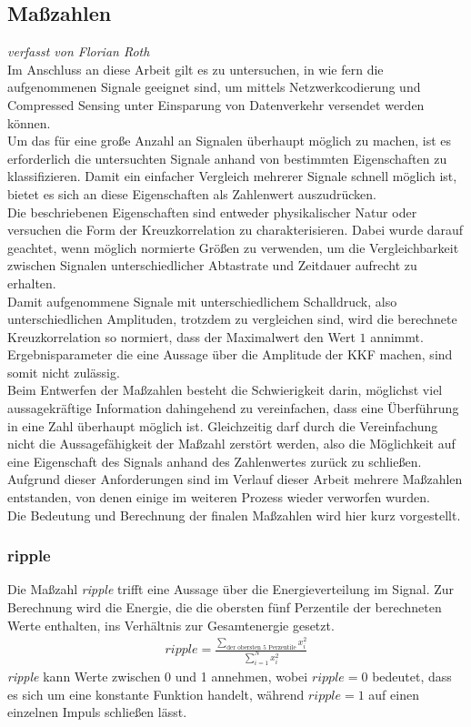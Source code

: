 \subsection{Maßzahlen}
\small\textit{verfasst von Florian Roth}
\normalsize
\\ Im Anschluss an diese Arbeit gilt es zu untersuchen, in wie fern die aufgenommenen Signale geeignet sind, um mittels Netzwerkcodierung und Compressed Sensing unter Einsparung von Datenverkehr versendet werden können. 
\\ Um das für eine große Anzahl an Signalen überhaupt möglich zu machen, ist es erforderlich die untersuchten Signale anhand von  bestimmten Eigenschaften zu klassifizieren. Damit ein einfacher Vergleich mehrerer Signale schnell möglich ist, bietet es sich an diese Eigenschaften als Zahlenwert auszudrücken. 
\\ Die beschriebenen Eigenschaften sind entweder physikalischer Natur oder versuchen die Form der Kreuzkorrelation zu charakterisieren. Dabei wurde darauf geachtet, wenn möglich normierte Größen zu verwenden, um die Vergleichbarkeit zwischen Signalen unterschiedlicher Abtastrate und Zeitdauer aufrecht zu erhalten. 
\\ Damit aufgenommene Signale mit unterschiedlichem Schalldruck, also unterschiedlichen Amplituden, trotzdem zu vergleichen sind, wird die berechnete Kreuzkorrelation so normiert, dass der Maximalwert den Wert $1$ annimmt. Ergebnisparameter die eine Aussage über die Amplitude der KKF machen, sind somit nicht zulässig.
\\ Beim Entwerfen der Maßzahlen besteht die Schwierigkeit darin, möglichst viel aussagekräftige Information dahingehend zu vereinfachen, dass eine Überführung in eine Zahl überhaupt möglich ist. Gleichzeitig darf durch die Vereinfachung nicht die Aussagefähigkeit der Maßzahl zerstört werden, also die Möglichkeit auf eine Eigenschaft des Signals anhand des Zahlenwertes zurück zu schließen. Aufgrund dieser Anforderungen sind im Verlauf dieser Arbeit mehrere Maßzahlen entstanden, von denen einige im weiteren Prozess wieder verworfen wurden. 
\\Die Bedeutung und Berechnung der finalen Maßzahlen wird hier kurz vorgestellt. 
\subsubsection{ripple}
Die Maßzahl \textit{ripple} trifft eine Aussage über die Energieverteilung im Signal. Zur Berechnung wird die Energie, die die obersten fünf Perzentile der berechneten Werte enthalten, ins Verhältnis zur Gesamtenergie gesetzt. 
\begin{align*}
ripple = \frac{\sum_{\text{der obersten 5 Perzentile}}x_{i}^2}{\sum_{i=1}^{N}x_{i}^2}
\end{align*}
\textit{ripple} kann Werte zwischen 0 und 1 annehmen, wobei $ripple = 0$ bedeutet, dass es sich um eine konstante Funktion handelt, während $ripple = 1$ auf einen einzelnen Impuls schließen lässt.
